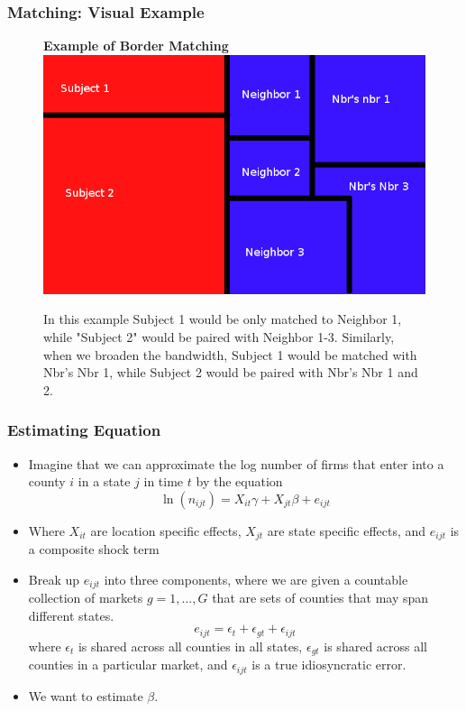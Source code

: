 \documentclass{beamer}
\begin{document}
\begin{frame}
\frametitle{Matching: Visual Example}
\begin{figure}[h]\label{rb}
    \centering
    \textbf{Example of Border Matching}
    \includegraphics[scale = 0.35]{../../analysis/output/borders_temp.png}
    \caption{In this example Subject 1 would be only matched to Neighbor 1, while "Subject 2" would be paired with Neighbor 1-3. Similarly, when we broaden the bandwidth, Subject 1 would be matched with Nbr's Nbr 1, while Subject 2 would be paired with Nbr's Nbr 1 and 2.}
\end{figure}
\end{frame}

\begin{frame}
\frametitle{Estimating Equation}
\begin{itemize}
\item Imagine that we can approximate the log number of firms that enter into a county $i$ in a state $j$ in time $t$ by the equation
$$\ln(n_{ijt}) = X_{it}\gamma + X_{jt}\beta + e_{ijt}$$
\item Where $X_{it}$ are location specific effects, $X_{jt}$ are state specific effects, and $e_{ijt}$ is a composite shock term
\item Break up $e_{ijt}$ into three components, where we are given a countable collection of markets $g = 1,...,G$ that are sets of counties that may span different states.
$$e_{ijt} = \epsilon_{t} + \epsilon_{gt}+\epsilon_{ijt}$$
where $\epsilon_{t}$ is shared across all counties in all states, $\epsilon_{gt}$ is shared across all counties in a particular market, and $\epsilon_{ijt}$ is a true idiosyncratic error.
\item We want to estimate $\beta$.
\end{itemize}
\end{frame}
\end{document}
